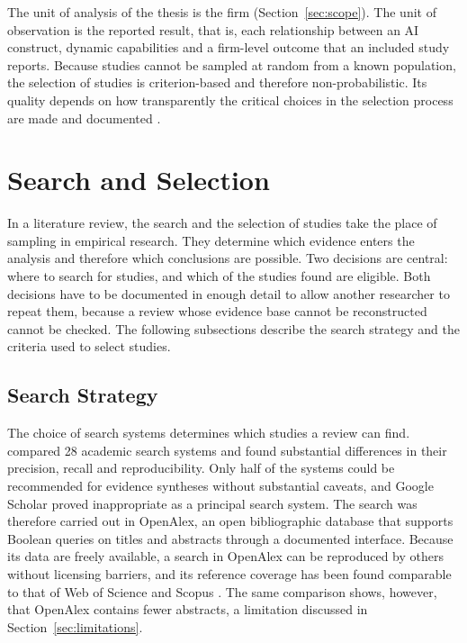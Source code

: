 The unit of analysis of the thesis is the firm (Section~\ref{sec:scope}). The unit of observation is the reported result, that is, each relationship between an AI construct, dynamic capabilities and a firm-level outcome that an included study reports. Because studies cannot be sampled at random from a known population, the selection of studies is criterion-based and therefore non-probabilistic. Its quality depends on how transparently the critical choices in the selection process are made and documented \parencite{hiebl2023}.

\section{Search and Selection}
\label{sec:searchselect}

In a literature review, the search and the selection of studies take the place of sampling in empirical research. They determine which evidence enters the analysis and therefore which conclusions are possible. Two decisions are central: where to search for studies, and which of the studies found are eligible. Both decisions have to be documented in enough detail to allow another researcher to repeat them, because a review whose evidence base cannot be reconstructed cannot be checked. The following subsections describe the search strategy and the criteria used to select studies.

\subsection{Search Strategy}
\label{sec:search}

The choice of search systems determines which studies a review can find. \textcite{gusenbauer2020} compared 28 academic search systems and found substantial differences in their precision, recall and reproducibility. Only half of the systems could be recommended for evidence syntheses without substantial caveats, and Google Scholar proved inappropriate as a principal search system. The search was therefore carried out in OpenAlex, an open bibliographic database that supports Boolean queries on titles and abstracts through a documented interface. Because its data are freely available, a search in OpenAlex can be reproduced by others without licensing barriers, and its reference coverage has been found comparable to that of Web of Science and Scopus \parencite{culbert2025}. The same comparison shows, however, that OpenAlex contains fewer abstracts, a limitation discussed in Section~\ref{sec:limitations}.

